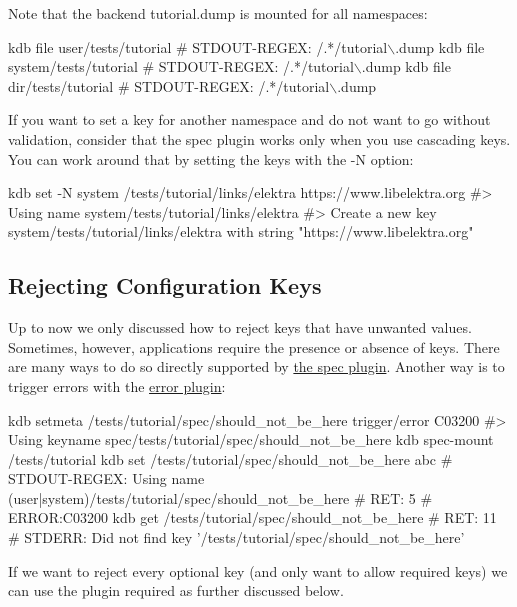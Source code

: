 Note that the backend {\ttfamily tutorial.\+dump} is mounted for all namespaces\+:


\begin{DoxyCode}
kdb file user/tests/tutorial
# STDOUT-REGEX: /.*/tutorial\(\backslash\).dump
kdb file system/tests/tutorial
# STDOUT-REGEX: /.*/tutorial\(\backslash\).dump
kdb file dir/tests/tutorial
# STDOUT-REGEX: /.*/tutorial\(\backslash\).dump
\end{DoxyCode}


If you want to set a key for another namespace and do not want to go without validation, consider that the spec plugin works only when you use cascading keys. You can work around that by setting the keys with the {\ttfamily -\/N} option\+:


\begin{DoxyCode}
kdb set -N system /tests/tutorial/links/elektra https://www.libelektra.org
#> Using name system/tests/tutorial/links/elektra
#> Create a new key system/tests/tutorial/links/elektra with string "https://www.libelektra.org"
\end{DoxyCode}


\subsection*{Rejecting Configuration Keys}

Up to now we only discussed how to reject keys that have unwanted values. Sometimes, however, applications require the presence or absence of keys. There are many ways to do so directly supported by \hyperlink{md_src_plugins_spec_README_src_plugins_spec_README_md}{the spec plugin}. Another way is to trigger errors with the \hyperlink{md_src_plugins_error_README_src_plugins_error_README_md}{error plugin}\+:


\begin{DoxyCode}
kdb setmeta /tests/tutorial/spec/should\_not\_be\_here trigger/error C03200
#> Using keyname spec/tests/tutorial/spec/should\_not\_be\_here
kdb spec-mount /tests/tutorial
kdb set /tests/tutorial/spec/should\_not\_be\_here abc
# STDOUT-REGEX: Using name (user|system)/tests/tutorial/spec/should\_not\_be\_here
# RET:    5
# ERROR:C03200
kdb get /tests/tutorial/spec/should\_not\_be\_here
# RET: 11
# STDERR: Did not find key '/tests/tutorial/spec/should\_not\_be\_here'
\end{DoxyCode}


If we want to reject every optional key (and only want to allow required keys) we can use the plugin {\ttfamily required} as further discussed below.

